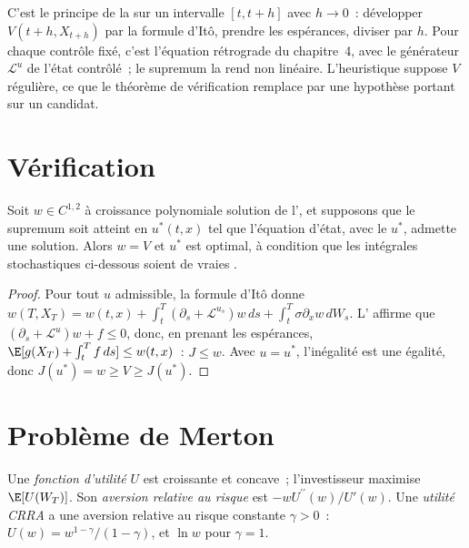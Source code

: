 C'est le principe de la  sur un intervalle $[t, t + h]$ avec $h \to 0$~: développer $V(t + h,
X_{t+h})$ par la formule d'Itô, prendre les espérances, diviser par $h$. Pour chaque contrôle fixé, c'est l'équation rétrograde
du chapitre~4, avec le générateur $\mathcal L^u$ de l'état contrôlé~; le supremum la rend non linéaire.
L'heuristique suppose $V$ régulière, ce que le théorème de vérification remplace par une
hypothèse portant sur un candidat.

\section{Vérification}

\begin{theorem}[Vérification]\label{thm:qm:stochastic-control:verification}
Soit $w \in C^{1,2}$ à croissance polynomiale solution de l', et supposons que le supremum soit atteint en
$u^*(t, x)$ tel que l'équation d'état, avec le  $u^*$, admette une solution. Alors $w = V$ et $u^*$ est
optimal, à condition que les intégrales stochastiques ci-dessous soient de vraies .
\end{theorem}

\begin{proof}
Pour tout $u$ admissible, la formule d'Itô donne $w(T, X_T) = w(t, x) + \int_t^T(\partial_s + \mathcal L^{u_s})w\,ds + \int_t^T\sigma
\partial_xw\,dW_s$. L' affirme que $(\partial_s + \mathcal L^u)w + f \le 0$, donc, en prenant les espérances, $\E[g(X_T) + \int_t^Tf\,ds] \le
w(t, x)$~: $J \le w$. Avec $u = u^*$, l'inégalité est une égalité, donc $J(u^*) = w \ge V \ge J(u^*)$.
\end{proof}

\section{Problème de Merton}

\begin{definition}\label{def:qm:stochastic-control:utility}
Une \emph{fonction d'utilité} $U$ est croissante et concave~; l'investisseur maximise
$\E[U(W_T)]$. Son \emph{aversion relative au risque} est $-wU^{\prime\prime}(w)/U'(w)$.
Une \emph{utilité CRRA} a une aversion relative au risque constante $\gamma > 0$~: $U(w) =
w^{1-\gamma}/(1 - \gamma)$, et $\ln w$ pour $\gamma = 1$.
\end{definition}

